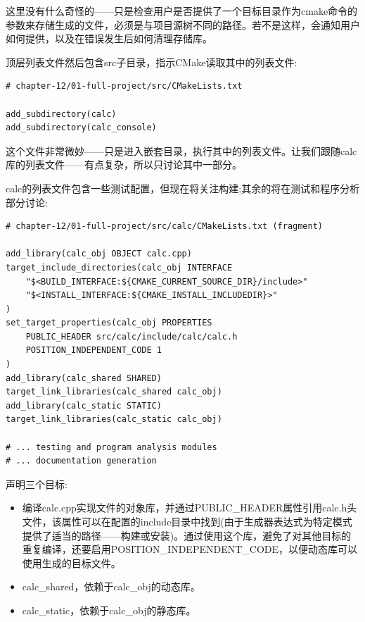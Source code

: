 这里没有什么奇怪的——只是检查用户是否提供了一个目标目录作为cmake命令的参数来存储生成的文件，必须是与项目源树不同的路径。若不是这样，会通知用户如何提供，以及在错误发生后如何清理存储库。

顶层列表文件然后包含src子目录，指示CMake读取其中的列表文件:

\begin{lstlisting}[style=styleCMake]
# chapter-12/01-full-project/src/CMakeLists.txt

add_subdirectory(calc)
add_subdirectory(calc_console)
\end{lstlisting}

这个文件非常微妙——只是进入嵌套目录，执行其中的列表文件。让我们跟随calc库的列表文件——有点复杂，所以只讨论其中一部分。


calc的列表文件包含一些测试配置，但现在将关注构建;其余的将在测试和程序分析部分讨论:

\begin{lstlisting}[style=styleCMake]
# chapter-12/01-full-project/src/calc/CMakeLists.txt (fragment)

add_library(calc_obj OBJECT calc.cpp)
target_include_directories(calc_obj INTERFACE
	"$<BUILD_INTERFACE:${CMAKE_CURRENT_SOURCE_DIR}/include>"
	"$<INSTALL_INTERFACE:${CMAKE_INSTALL_INCLUDEDIR}>"
)
set_target_properties(calc_obj PROPERTIES
	PUBLIC_HEADER src/calc/include/calc/calc.h
	POSITION_INDEPENDENT_CODE 1
)
add_library(calc_shared SHARED)
target_link_libraries(calc_shared calc_obj)
add_library(calc_static STATIC)
target_link_libraries(calc_static calc_obj)

# ... testing and program analysis modules
# ... documentation generation
\end{lstlisting}

声明三个目标:

\begin{itemize}
\item 
编译calc.cpp实现文件的对象库，并通过PUBLIC\_HEADER属性引用calc.h头文件，该属性可以在配置的include目录中找到(由于生成器表达式为特定模式提供了适当的路径——构建或安装)。通过使用这个库，避免了对其他目标的重复编译，还要启用POSITION\_INDEPENDENT\_CODE，以便动态库可以使用生成的目标文件。

\item 
calc\_shared，依赖于calc\_obj的动态库。

\item 
calc\_static，依赖于calc\_obj的静态库。
\end{itemize}

